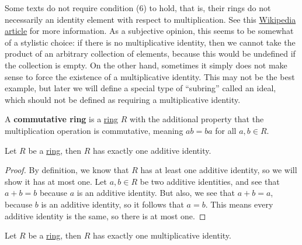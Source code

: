 \documentclass{scrartcl}
\begin{document}
\begin{definition}[Ring]
    Some texts do not require condition (6) to hold, that is, their rings do not necessarily an identity element with
    respect to multiplication.
    See this \href{https://en.wikipedia.org/wiki/Ring_(mathematics)#Notes_on_the_definition}{Wikipedia article} for
    more information.
    As a subjective opinion, this seems to be somewhat of a stylistic choice: if there is no multiplicative identity,
    then we cannot take the product of an arbitrary collection of elements, because this would be undefined if the
    collection is empty.
    On the other hand, sometimes it simply does not make sense to force the existence of a multiplicative identity.
    This may not be the best example, but later we will define a special type of ``subring'' called an ideal, which
    should not be defined as requiring a multiplicative identity.
\end{definition}

\begin{definition}
    \label{def:commutative ring}
    A \textbf{commutative ring} is a \hyperref[def:ring]{ring} $R$ with the additional property that the multiplication
    operation is commutative, meaning $ab=ba$ for all $a,b\in R$.
\end{definition}

\begin{proposition}
    \label{prop:unique additive identity}
    Let $R$ be a \hyperref[def:ring]{ring}, then $R$ has exactly one additive identity.
\end{proposition}

\begin{proof}
    By definition, we know that $R$ has at least one additive identity, so we will show it has at most one.
    Let $a,b\in R$ be two additive identities, and see that $a+b=b$ because $a$ is an additive identity.
    But also, we see that $a+b=a$, because $b$ is an additive identity, so it follows that $a=b$.
    This means every additive identity is the same, so there is at most one.
\end{proof}

\begin{proposition}
    \label{prop:unique multiplicative identity}
    Let $R$ be a \hyperref[def:ring]{ring}, then $R$ has exactly one multiplicative identity.
\end{proposition}
\end{document}
